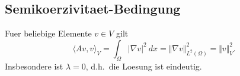 \documentclass{article}
\begin{document}
\subsection*{Semikoerzivitaet-Bedingung}

Fuer beliebige Elemente $v \in V$ gilt
\begin{equation*}
  {\langle Av, v \rangle}_V
  = \int_{\Omega} {\vert \nabla v \vert}^2 \ dx
  = {\Vert \nabla v \Vert}_{L^2(\Omega)}^2
  = {\Vert v \Vert}_V^2.
\end{equation*}
Insbesondere ist $\lambda=0$, d.h.\ die Loesung ist eindeutig.
\end{document}
